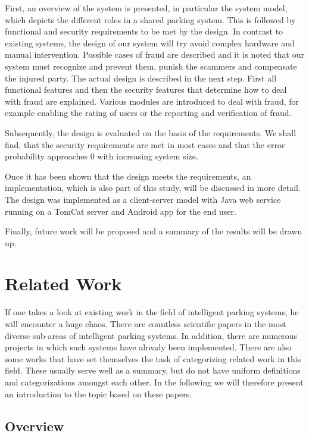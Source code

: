 \documentclass[
a4paper,     %
titlepage,   %
14pt         %
]{scrartcl}  %
\theoremstyle{mystyle}
\begin{document}
First, an overview of the system is presented, in particular the system model, which depicts the different roles in a shared parking system. This is followed by functional and security requirements to be met by the design. In contrast to existing systems, the design of our system will try avoid complex hardware and manual intervention. Possible cases of fraud are described and it is noted that our system must recognize and prevent them, punish the scammers and compensate the injured party. The actual design is described in the next step. First all functional features and then the security features that determine how to deal with fraud are explained. Various modules are introduced to deal with fraud, for example enabling the rating of users or the reporting and verification of fraud. 

Subsequently, the design is evaluated on the basis of the requirements. We shall find, that the security requirements are met in most cases and that the error probability approaches 0 with increasing system size.

Once it has been shown that the design meets the requirements, an implementation, which is also part of this study, will be discussed in more detail. The design was implemented as a client-server model with Java web service running on a TomCat server and Android app for the end user.

Finally, future work will be proposed and a summary of the results will be drawn up.

\section{Related Work}
If one takes a look at existing work in the field of intelligent parking systems, he will encounter a huge chaos. There are countless scientific papers in the most diverse sub-areas of intelligent parking systems. In addition, there are numerous projects in which such systems have already been implemented. There are also some works that have set themselves the task of categorizing related work in this field. These usually serve well as a summary, but do not have uniform definitions and categorizations amongst each other. In the following we will therefore present an introduction to the topic based on these papers.

\subsection{Overview}
\end{document}
